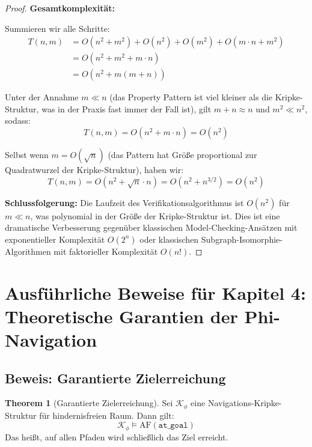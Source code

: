 ﻿\documentclass[a4paper,12pt]{article}
\theoremstyle{definition}
\newtheorem{theorem}{Theorem}[section]
\begin{document}
\begin{proof}
\textbf{Gesamtkomplexität:}

Summieren wir alle Schritte:
\begin{align}
T(n, m) &= O(n^2 + m^2) + O(n^2) + O(m^2) + O(m \cdot n + m^2) \\
&= O(n^2 + m^2 + m \cdot n) \\
&= O(n^2 + m(m + n))
\end{align}

Unter der Annahme $m \ll n$ (das Property Pattern ist viel kleiner als die Kripke-Struktur, was in der Praxis fast immer der Fall ist), gilt $m + n \approx n$ und $m^2 \ll n^2$, sodass:
\begin{equation}
T(n, m) = O(n^2 + m \cdot n) = O(n^2)
\end{equation}

Selbst wenn $m = O(\sqrt{n})$ (das Pattern hat Größe proportional zur Quadratwurzel der Kripke-Struktur), haben wir:
\begin{equation}
T(n, m) = O(n^2 + \sqrt{n} \cdot n) = O(n^2 + n^{3/2}) = O(n^2)
\end{equation}

\textbf{Schlussfolgerung:} Die Laufzeit des Verifikationsalgorithmus ist $O(n^2)$ für $m \ll n$, was polynomial in der Größe der Kripke-Struktur ist. Dies ist eine dramatische Verbesserung gegenüber klassischen Model-Checking-Ansätzen mit exponentieller Komplexität $O(2^n)$ oder klassischen Subgraph-Isomorphie-Algorithmen mit faktorieller Komplexität $O(n!)$.
\end{proof}

\newpage

\section{Ausführliche Beweise für Kapitel 4: Theoretische Garantien der Phi-Navigation}

\subsection{Beweis: Garantierte Zielerreichung}

\begin{theorem}[Garantierte Zielerreichung]
Sei $\mathcal{K}_{\phi}$ eine Navigations-Kripke-Struktur für hindernisfreien Raum. Dann gilt:
\[
\mathcal{K}_{\phi} \models \text{AF}(\texttt{at\_goal})
\]
Das heißt, auf allen Pfaden wird schließlich das Ziel erreicht.
\end{theorem}
\end{document}
